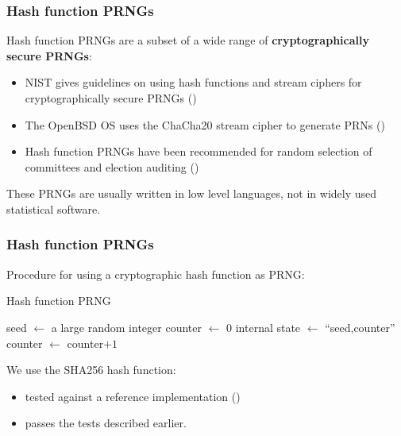 \documentclass{beamer}
\newcommand*\Let[2]{\State #1 $\gets$ #2}
\newcommand{\bit}{\begin{itemize}}
\newcommand{\eit}{\end{itemize}}
\begin{document}
\begin{frame}
\frametitle{Hash function PRNGs}

Hash function PRNGs are a subset of a wide range of \textbf{cryptographically secure PRNGs}:
\vspace{10pt}
\bit
\item NIST gives guidelines on using hash functions and stream ciphers for cryptographically secure PRNGs (\cite{barker_nist_2015})
\item The OpenBSD OS uses the ChaCha20 stream cipher to generate PRNs (\cite{openbsd_arc4random_2014, chacha_bernstein_208})
\item Hash function PRNGs have been recommended for random selection of committees and election auditing (\cite{publicly_motorola_2004, rivest_reference_2011})
\eit
\vspace{10pt}

These PRNGs are usually written in low level languages, not in widely used statistical software.
\end{frame}




\begin{frame}\label{sha256_procedure}
\frametitle{Hash function PRNGs}

Procedure for using a cryptographic hash function as PRNG:


\begin{algorithm}[H]                      %
\caption{Hash function PRNG}          %
\label{hash_prng}                           %
\begin{algorithmic}[1]             %
\Let{seed}{a large random integer}
\Let{counter}{$0$}
     \Let{internal state}{``seed,counter''}
     \Let{counter}{counter$ + 1$}
\EndFor
\end{algorithmic}
\end{algorithm}


We use the SHA256 hash function:

\bit
\item tested against a reference implementation (\cite{rivest_reference_2011}) 
\item passes the tests described earlier. \hyperlink{sha256_tests}{}
\eit
\end{frame}
\end{document}

